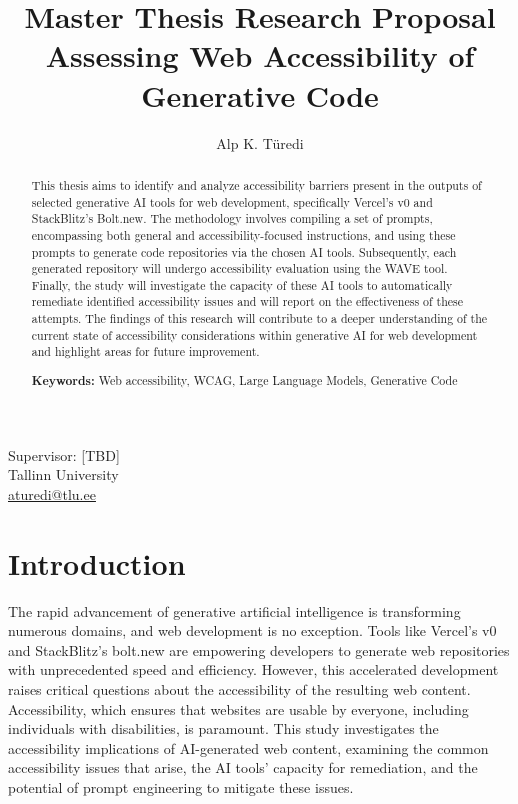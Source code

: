 \documentclass{article}
\title{%
    \textbf{Master Thesis Research Proposal}\\
    \vfill
    \textbf{Assessing Web Accessibility of Generative Code}
    }
\author{Alp K. Türedi}
\begin{document}
\maketitle

{\centering
    Supervisor: [TBD]\\
    \vfill
    Tallinn University\\
    \href{mailto:aturedi@tlu.ee}{aturedi@tlu.ee}\\ 
    }

\begin{abstract}
This thesis aims to identify and analyze accessibility barriers present in the outputs of selected generative AI tools for web development, specifically Vercel's v0 and StackBlitz's Bolt.new. The methodology involves compiling a set of prompts, encompassing both general and accessibility-focused instructions, and using these prompts to generate code repositories via the chosen AI tools. Subsequently, each generated repository will undergo accessibility evaluation using the WAVE tool. Finally, the study will investigate the capacity of these AI tools to automatically remediate identified accessibility issues and will report on the effectiveness of these attempts. The findings of this research will contribute to a deeper understanding of the current state of accessibility considerations within generative AI for web development and highlight areas for future improvement.

\vfill
\textbf{Keywords:} Web accessibility, WCAG, Large Language Models, Generative Code
\end{abstract}


\section{Introduction}
The rapid advancement of generative artificial intelligence is transforming numerous domains, and web development is no exception. Tools like Vercel's v0 and StackBlitz's bolt.new are empowering developers to generate web repositories with unprecedented speed and efficiency. However, this accelerated development raises critical questions about the accessibility of the resulting web content. Accessibility, which ensures that websites are usable by everyone, including individuals with disabilities, is paramount. This study investigates the accessibility implications of AI-generated web content, examining the common accessibility issues that arise, the AI tools' capacity for remediation, and the potential of prompt engineering to mitigate these issues.
\end{document}
